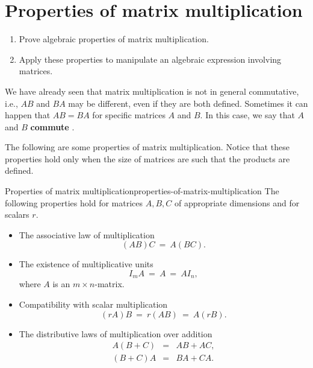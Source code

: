 \section{Properties of matrix multiplication}

\begin{outcome}
  \begin{enumerate}
  \item Prove algebraic properties of matrix multiplication.
  \item Apply these properties to manipulate an algebraic expression
    involving matrices.
  \end{enumerate}
\end{outcome}

We have already seen that matrix multiplication is not in general
commutative, i.e., $AB$ and $BA$ may be different, even if they are
both defined. Sometimes it can happen that $AB=BA$ for specific
matrices $A$ and $B$. In this case, we say that $A$ and $B$
\textbf{commute}%
.

The following are some properties of matrix multiplication.  Notice
that these properties hold only when the size of matrices are such
that the products are defined.

\begin{theorem}{Properties of matrix multiplication}{properties-of-matrix-multiplication}
  The following properties hold%
   for matrices $A,B,C$
  of appropriate dimensions and for scalars $r$.
  \begin{itemize}
  \item The associative law of multiplication
    \begin{equation*}
      (AB)C ~=~ A(BC).
    \end{equation*}
  \item The existence of multiplicative units
    \begin{equation*}
      I_mA ~=~ A ~=~ AI_n,
    \end{equation*}
    where $A$ is an $m\times n$-matrix.
  \item Compatibility with scalar multiplication
    \begin{equation*}
      (rA)B ~=~ r(AB) ~=~ A(rB).
    \end{equation*}
  \item The distributive laws of multiplication over addition
    \begin{eqnarray*}
      A(B+C) &=& AB + AC, \\
      (B+C)A &=& BA + CA.
    \end{eqnarray*}
  \end{itemize}
\end{theorem}

